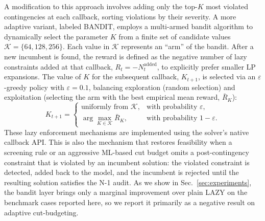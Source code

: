 \documentclass[runningheads]{llncs}
\begin{document}
A modification to this approach involves adding only the top-$K$ most violated contingencies at each callback, sorting violations by their severity. A more adaptive variant, labeled BANDIT, employs a multi-armed bandit algorithm to dynamically select the parameter $K$ from a finite set of candidate values $\mathcal{K}=\{64,128,256\}$. Each value in $\mathcal{K}$ represents an ``arm'' of the bandit. After a new incumbent is found, the reward is defined as the negative number of lazy constraints added at that callback, $R_t=-N_t^{\mathrm{added}}$, to explicitly prefer smaller LP expansions. The value of $K$ for the subsequent callback, $K_{t+1}$, is selected via an $\varepsilon$-greedy policy with $\varepsilon=0.1$, balancing exploration (random selection) and exploitation (selecting the arm with the best empirical mean reward, $\bar{R}_K$):
\begin{equation}
K_{t+1}=\begin{cases}
\text{uniformly from }\mathcal{K}, & \text{with probability }\varepsilon, \\
\arg\max_{K\in\mathcal{K}}\bar{R}_K, & \text{with probability }1-\varepsilon.
\end{cases}
\end{equation}
These lazy enforcement mechanisms are implemented using the solver's native callback API. This is also the mechanism that restores feasibility when a screening rule or an aggressive ML-based cut budget omits a post-contingency constraint that is violated by an incumbent solution: the violated constraint is detected, added back to the model, and the incumbent is rejected until the resulting solution satisfies the N-1 audit. As we show in Sec.~\ref{sec:experiments}, the bandit layer brings only a marginal improvement over plain LAZY on the benchmark cases reported here, so we report it primarily as a negative result on adaptive cut-budgeting.
\end{document}
